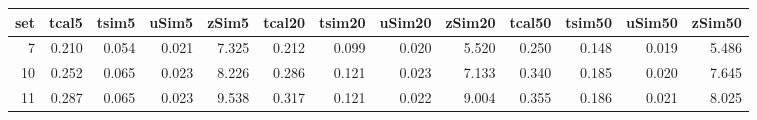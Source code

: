 
\begin{tabular}{r|r|r|r|r|r|r|r|r|r|r|r|r}
\hline
set & tcal5 & tsim5 & uSim5 & zSim5 & tcal20 & tsim20 & uSim20 & zSim20 & tcal50 & tsim50 & uSim50 & zSim50\\
\hline
7 & 0.210 & 0.054 & 0.021 & 7.325 & 0.212 & 0.099 & 0.020 & 5.520 & 0.250 & 0.148 & 0.019 & 5.486\\
\hline
10 & 0.252 & 0.065 & 0.023 & 8.226 & 0.286 & 0.121 & 0.023 & 7.133 & 0.340 & 0.185 & 0.020 & 7.645\\
\hline
11 & 0.287 & 0.065 & 0.023 & 9.538 & 0.317 & 0.121 & 0.022 & 9.004 & 0.355 & 0.186 & 0.021 & 8.025\\
\hline
\end{tabular}
